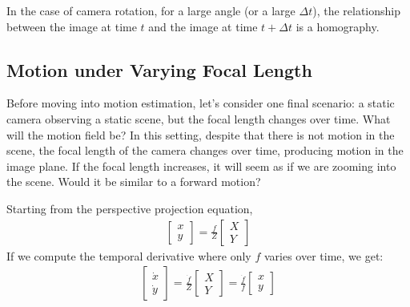 In the case of camera rotation, for a large angle (or a large $\Delta t$), the relationship between the image at time $t$ and the image at time $t+\Delta t$ is a homography.






\subsection{Motion under Varying Focal Length}

Before moving into motion estimation, let's consider one final scenario: a static camera observing a static scene, but the focal length changes over time. What will the motion field be?  In this setting, despite that there is not motion in the scene, the focal length of the camera changes over time, producing motion in the image plane. If the focal length increases, it will seem as if we are zooming into the scene. Would it be similar to a forward motion?

Starting from the perspective projection equation,
\begin{align}
    \begin{bmatrix}
        x \\
        y
    \end{bmatrix}
    = \frac{f}{Z}
    \begin{bmatrix}
        X \\
        Y
    \end{bmatrix}
    \label{eq:pers_proj}
\end{align}
If we compute the temporal derivative where only $f$ varies over time, we get:
\begin{align}
    \begin{bmatrix}
        \dot{x} \\
        \dot{y}
    \end{bmatrix}
    = \frac{\dot{f}}{Z}
    \begin{bmatrix}
        X \\
        Y
    \end{bmatrix}
    =
    \frac{\dot{f}}{f}
    \begin{bmatrix}
        x \\
        y
    \end{bmatrix}
\end{align}

